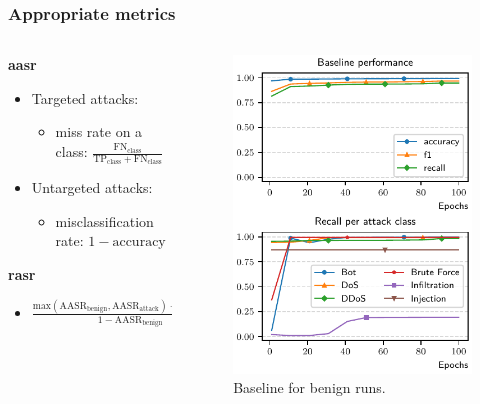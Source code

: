 \documentclass[color,t,presentation,english,aspectratio=169]{beamer}
\begin{document}
	\begin{frame}
	\frametitle{Appropriate metrics}
	
	\begin{columns}
		\begin{column}{0.55\textwidth}
			\textbf{\Gls{aasr}}

			\begin{itemize}
				\item Targeted attacks:
				\begin{itemize}
					\item miss rate on a class: $\frac{\text{FN}_\text{class}}{\text{TP}_\text{class} + \text{FN}_\text{class}}$
				\end{itemize}
				\item Untargeted attacks:
				\begin{itemize}
					\item misclassification rate: $1 - \text{accuracy}$
				\end{itemize}
			\end{itemize}

			\textbf{\Gls{rasr}}

			\begin{itemize}
				\item $\frac{
					\text{max}(\text{AASR}_\text{benign}, \text{AASR}_\text{attack}) - \text{AASR}_\text{benign}
				}{
					1 - \text{AASR}_\text{benign}
				}$
			\end{itemize}
		\end{column}
		\begin{column}{0.35\textwidth}
			\vspace{-3ex}
			\begin{figure}
				\centering
				\includegraphics[width=.8\linewidth]{figures/baseline.pdf}
				\caption{Baseline for benign runs.}
			\end{figure}


\end{column}
\end{columns}
\end{frame}
\end{document}
